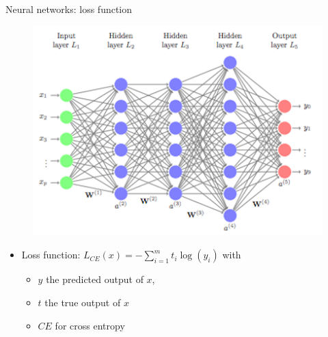 \documentclass{beamer}
\begin{document}
\begin{frame}{Neural networks: loss function}
    

\begin{figure}
    \centering
    \includegraphics[scale=0.4]{images/neuralnetwork.png}
    \label{fig:nn}
\end{figure}
    
\begin{itemize}
    \item Loss function: $L_{CE}(x) = - \displaystyle\sum_{i=1} ^{m} t_i \log(y_i)$ with 
    \begin{itemize}
        \item $y$ the predicted output of $x$,
        \item $t$ the true output of $x$
        \item $CE$ for cross entropy
    \end{itemize}
\end{itemize}
    
\end{frame}
\end{document}
